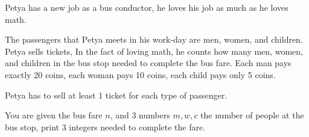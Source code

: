 Petya has a new job as a bus conductor, he loves his job as much as he loves math.

The passengers that Petya meets in his work-day are men, women, and children.
Petya sells tickets, In the fact of loving math, he counts how many men, women, and children in the bus stop needed to complete the bus fare.
Each man pays exactly 20 coins, each woman pays 10 coins, each child pays only 5 coins.

Petya has to sell at least 1 ticket for each type of passenger.

You are given the bus fare $n$, and 3 numbers $m, w, c$ the number of people at the bus stop, print 3 integers needed to complete the fare.